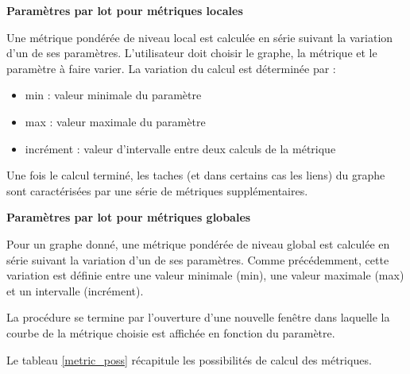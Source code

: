 \documentclass{article}
\begin{document}
\textbf{Paramètres par lot pour métriques locales}

Une métrique pondérée de niveau local est calculée en série suivant la variation d’un de ses paramètres. L’utilisateur doit choisir le graphe, la métrique et le paramètre à faire varier. La variation du calcul est déterminée par :
\begin{itemize}
	\item min : valeur minimale du paramètre
	\item max : valeur maximale du paramètre
	\item incrément : valeur d’intervalle entre deux calculs de la métrique
\end{itemize}

Une fois le calcul terminé, les taches (et dans certains cas les liens) du graphe sont caractérisées par une série de métriques supplémentaires.

\textbf{Paramètres par lot pour métriques globales}

Pour un graphe donné, une métrique pondérée de niveau global est calculée en série suivant la variation d’un de ses paramètres. Comme précédemment, cette variation est définie entre une valeur minimale (min), une valeur maximale (max) et un intervalle (incrément).

La procédure se termine par l’ouverture d’une nouvelle fenêtre dans laquelle la courbe de la métrique choisie est affichée en fonction du paramètre. 

Le tableau \ref{metric_poss} récapitule les possibilités de calcul des métriques.
\end{document}

